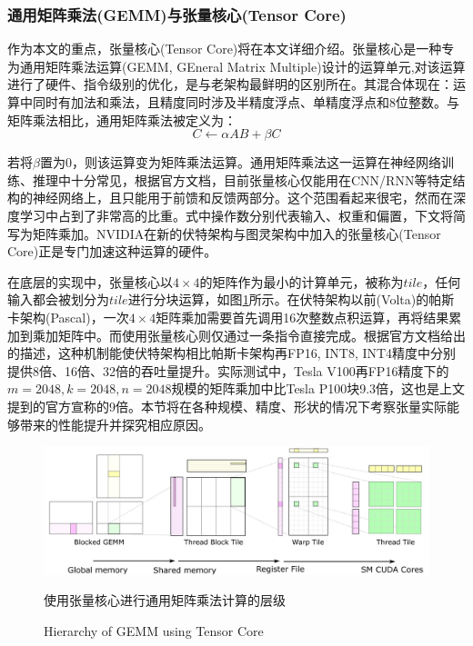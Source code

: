 \subsubsection{通用矩阵乘法(GEMM)与张量核心(Tensor Core)}  
\par 作为本文的重点，张量核心(Tensor Core)将在本文详细介绍。张量核心是一种专为通用矩阵乘法运算(GEMM, GEneral Matrix Multiple)设计的运算单元,对该运算进行了硬件、指令级别的优化，是与老架构最鲜明的区别所在。其混合体现在：运算中同时有加法和乘法，且精度同时涉及半精度浮点、单精度浮点和8位整数。与矩阵乘法相比，通用矩阵乘法被定义为：
$$ C \leftarrow \alpha AB + \beta C $$
\par 若将$ \beta $置为0，则该运算变为矩阵乘法运算。通用矩阵乘法这一运算在神经网络训练、推理中十分常见，根据官方文档，目前张量核心仅能用在CNN/RNN等特定结构的神经网络上，且只能用于前馈和反馈两部分。这个范围看起来很宅，然而在深度学习中占到了非常高的比重。式中操作数分别代表输入、权重和偏置，下文将简写为矩阵乘加。NVIDIA在新的伏特架构与图灵架构中加入的张量核心(Tensor Core)正是专门加速这种运算的硬件。
\par 在底层的实现中，张量核心以$ 4 \times 4 $的矩阵作为最小的计算单元，被称为$ tile $，任何输入都会被划分为$ tile $进行分块运算，如图\ref{Fig.Tile}所示\parencite{CUTLASS}。在伏特架构以前(Volta)的帕斯卡架构(Pascal)，一次$ 4 \times 4 $矩阵乘加需要首先调用16次整数点积运算，再将结果累加到乘加矩阵中。而使用张量核心则仅通过一条指令直接完成。根据官方文档给出的描述，这种机制能使伏特架构相比帕斯卡架构再FP16, INT8, INT4精度中分别提供8倍、16倍、32倍的吞吐量提升。实际测试中，Tesla V100再FP16精度下的$ m=2048, k=2048, n = 2048 $规模的矩阵乘加中比Tesla P100块9.3倍\parencite{VOLTAWHITEPAPER}，这也是上文提到的官方宣称的9倍。本节将在各种规模、精度、形状的情况下考察张量实际能够带来的性能提升并探究相应原因。
\begin{figure}
	\centering
	\includegraphics[width=15cm]{figures/Tile.jpg}
	\renewcommand{\thefigure}{\arabic{section}-\arabic{figure} }
	\renewcommand{\figurename}{图}
	\caption{使用张量核心进行通用矩阵乘法计算的层级}
	\addtocounter{figure}{-1}
	\renewcommand{\thefigure}{\arabic{section}-\arabic{figure} }
	\renewcommand{\figurename}{Figure}
	\caption{Hierarchy of GEMM using Tensor Core}
	\label{Fig.Tile}
\end{figure}
